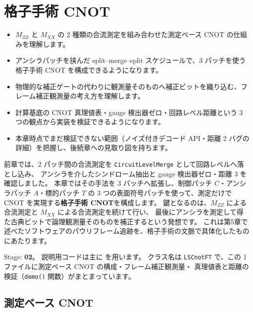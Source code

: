 \chapter{格子手術 CNOT}\label{ch:ls_cnot}

\begin{chaptergoal}
  \begin{itemize}
  \item $M_{ZZ}$ と $M_{XX}$ の 2 種類の合流測定を組み合わせた測定ベース CNOT の仕組みを理解します。
  \item アンシラパッチを挟んだ split–merge–split スケジュールで、3 パッチを使う格子手術 CNOT を構成できるようになります。
  \item 物理的な補正ゲートの代わりに観測量そのものへ補正ビットを織り込む、フレーム補正観測量の考え方を理解します。
  \item 計算基底の CNOT 真理値表・gauge 検出器ゼロ・回路レベル距離という 3 つの観点から実装を検証できるようになります。
  \item 本章時点でまだ検証できない範囲（ノイズ付きデコード API・距離 2 バグの詳細）を把握し、後続章への見取り図を持ちます。
  \end{itemize}
\end{chaptergoal}

前章では、2 パッチ間の合流測定を \texttt{CircuitLevelMerge} として回路レベルへ落とし込み、
アンシラを介したシンドローム抽出と gauge 検出器ゼロ・距離 3 を確認しました。
本章ではその手法を 3 パッチへ拡張し、制御パッチ $C$・アンシラパッチ $A$・標的パッチ $T$ の
3 つの表面符号パッチを使って、測定だけで CNOT を実現する\textbf{格子手術 CNOT}を構成します。
鍵となるのは、$M_{ZZ}$ による合流測定と $M_{XX}$ による合流測定を続けて行い、
最後にアンシラを測定して得た古典ビットで論理観測量そのものを補正するという発想です。
これは第5章で述べたソフトウェアのパウリフレーム追跡を、格子手術の文脈で具体化したものにあたります。

\begin{notebox}
  Stage: \textbf{02}。
  説明用コードは主に  を用います。
  クラス名は \texttt{LSCnotFT} で、この 1 ファイルに測定ベース CNOT の構成・フレーム補正観測量・
  真理値表と距離の検証（\texttt{demo()} 関数）がまとまっています。
\end{notebox}

\section{測定ベース CNOT}\label{sec:mb_cnot}

